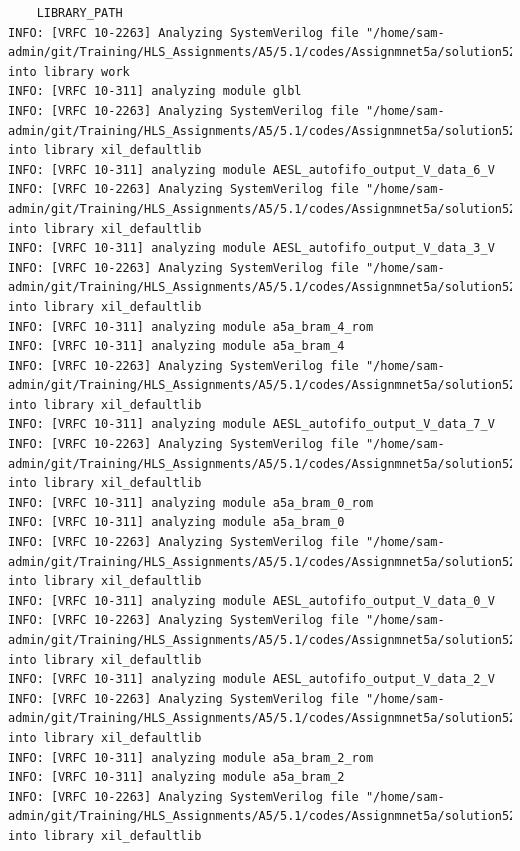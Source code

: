 \documentclass{article}
\begin{document}
\begin{lstlisting}
    LIBRARY_PATH
INFO: [VRFC 10-2263] Analyzing SystemVerilog file "/home/sam-admin/git/Training/HLS_Assignments/A5/5.1/codes/Assignmnet5a/solution52a/sim/verilog/glbl.v" into library work
INFO: [VRFC 10-311] analyzing module glbl
INFO: [VRFC 10-2263] Analyzing SystemVerilog file "/home/sam-admin/git/Training/HLS_Assignments/A5/5.1/codes/Assignmnet5a/solution52a/sim/verilog/AESL_autofifo_output_V_data_6_V.v" into library xil_defaultlib
INFO: [VRFC 10-311] analyzing module AESL_autofifo_output_V_data_6_V
INFO: [VRFC 10-2263] Analyzing SystemVerilog file "/home/sam-admin/git/Training/HLS_Assignments/A5/5.1/codes/Assignmnet5a/solution52a/sim/verilog/AESL_autofifo_output_V_data_3_V.v" into library xil_defaultlib
INFO: [VRFC 10-311] analyzing module AESL_autofifo_output_V_data_3_V
INFO: [VRFC 10-2263] Analyzing SystemVerilog file "/home/sam-admin/git/Training/HLS_Assignments/A5/5.1/codes/Assignmnet5a/solution52a/sim/verilog/a5a_bram_4.v" into library xil_defaultlib
INFO: [VRFC 10-311] analyzing module a5a_bram_4_rom
INFO: [VRFC 10-311] analyzing module a5a_bram_4
INFO: [VRFC 10-2263] Analyzing SystemVerilog file "/home/sam-admin/git/Training/HLS_Assignments/A5/5.1/codes/Assignmnet5a/solution52a/sim/verilog/AESL_autofifo_output_V_data_7_V.v" into library xil_defaultlib
INFO: [VRFC 10-311] analyzing module AESL_autofifo_output_V_data_7_V
INFO: [VRFC 10-2263] Analyzing SystemVerilog file "/home/sam-admin/git/Training/HLS_Assignments/A5/5.1/codes/Assignmnet5a/solution52a/sim/verilog/a5a_bram_0.v" into library xil_defaultlib
INFO: [VRFC 10-311] analyzing module a5a_bram_0_rom
INFO: [VRFC 10-311] analyzing module a5a_bram_0
INFO: [VRFC 10-2263] Analyzing SystemVerilog file "/home/sam-admin/git/Training/HLS_Assignments/A5/5.1/codes/Assignmnet5a/solution52a/sim/verilog/AESL_autofifo_output_V_data_0_V.v" into library xil_defaultlib
INFO: [VRFC 10-311] analyzing module AESL_autofifo_output_V_data_0_V
INFO: [VRFC 10-2263] Analyzing SystemVerilog file "/home/sam-admin/git/Training/HLS_Assignments/A5/5.1/codes/Assignmnet5a/solution52a/sim/verilog/AESL_autofifo_output_V_data_2_V.v" into library xil_defaultlib
INFO: [VRFC 10-311] analyzing module AESL_autofifo_output_V_data_2_V
INFO: [VRFC 10-2263] Analyzing SystemVerilog file "/home/sam-admin/git/Training/HLS_Assignments/A5/5.1/codes/Assignmnet5a/solution52a/sim/verilog/a5a_bram_2.v" into library xil_defaultlib
INFO: [VRFC 10-311] analyzing module a5a_bram_2_rom
INFO: [VRFC 10-311] analyzing module a5a_bram_2
INFO: [VRFC 10-2263] Analyzing SystemVerilog file "/home/sam-admin/git/Training/HLS_Assignments/A5/5.1/codes/Assignmnet5a/solution52a/sim/verilog/a5a_bram_5.v" into library xil_defaultlib

\end{lstlisting}
\end{document}
